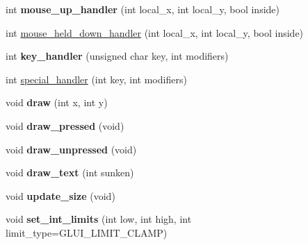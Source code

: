 \begin{DoxyCompactItemize}
\item 
\hypertarget{classGLUI__Scrollbar_a89178e785dc2238966c5865b58f3f502}{int {\bfseries mouse\-\_\-up\-\_\-handler} (int local\-\_\-x, int local\-\_\-y, bool inside)}\label{classGLUI__Scrollbar_a89178e785dc2238966c5865b58f3f502}

\item 
int \hyperlink{classGLUI__Scrollbar_a7ab8e938ca0cbd466bf1951afc4397f8}{mouse\-\_\-held\-\_\-down\-\_\-handler} (int local\-\_\-x, int local\-\_\-y, bool inside)
\item 
\hypertarget{classGLUI__Scrollbar_acb4a0198d2b6550d4c78a389e1972098}{int {\bfseries key\-\_\-handler} (unsigned char key, int modifiers)}\label{classGLUI__Scrollbar_acb4a0198d2b6550d4c78a389e1972098}

\item 
int \hyperlink{classGLUI__Scrollbar_a88f94cf8ce76c4976d7ac8ae0b739925}{special\-\_\-handler} (int key, int modifiers)
\item 
\hypertarget{classGLUI__Scrollbar_afa2e4b7a10b10bb593ed71b14345217f}{void {\bfseries draw} (int x, int y)}\label{classGLUI__Scrollbar_afa2e4b7a10b10bb593ed71b14345217f}

\item 
\hypertarget{classGLUI__Scrollbar_a1589afa827b869eaf57e974c92021a77}{void {\bfseries draw\-\_\-pressed} (void)}\label{classGLUI__Scrollbar_a1589afa827b869eaf57e974c92021a77}

\item 
\hypertarget{classGLUI__Scrollbar_a3f93fe95f02722fbd6117854eeaa23f5}{void {\bfseries draw\-\_\-unpressed} (void)}\label{classGLUI__Scrollbar_a3f93fe95f02722fbd6117854eeaa23f5}

\item 
\hypertarget{classGLUI__Scrollbar_acefbec38ea1cb5725217fe88382ffc8f}{void {\bfseries draw\-\_\-text} (int sunken)}\label{classGLUI__Scrollbar_acefbec38ea1cb5725217fe88382ffc8f}

\item 
\hypertarget{classGLUI__Scrollbar_a93ddd03928b9dca260263ee135c0f3a6}{void {\bfseries update\-\_\-size} (void)}\label{classGLUI__Scrollbar_a93ddd03928b9dca260263ee135c0f3a6}

\item 
\hypertarget{classGLUI__Scrollbar_a24df16f55c3810ac5c3e09f1d7d5c70d}{void {\bfseries set\-\_\-int\-\_\-limits} (int low, int high, int limit\-\_\-type=G\-L\-U\-I\-\_\-\-L\-I\-M\-I\-T\-\_\-\-C\-L\-A\-M\-P)}\label{classGLUI__Scrollbar_a24df16f55c3810ac5c3e09f1d7d5c70d}


\end{DoxyCompactItemize}
